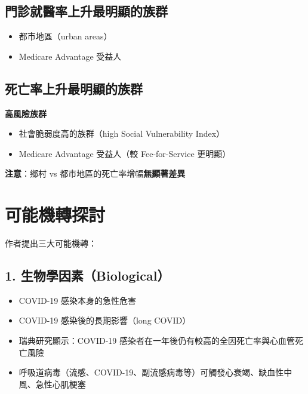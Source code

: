 \documentclass[12pt,a4paper]{article}
\begin{document}
\subsection{門診就醫率上升最明顯的族群}
\begin{itemize}
    \item 都市地區（urban areas）
    \item Medicare Advantage 受益人
\end{itemize}

\subsection{死亡率上升最明顯的族群}

\begin{importantbox}
\textbf{高風險族群}
\begin{itemize}
    \item 社會脆弱度高的族群（high Social Vulnerability Index）
    \item Medicare Advantage 受益人（較 Fee-for-Service 更明顯）
\end{itemize}

\textbf{注意}：鄉村 vs 都市地區的死亡率增幅\textbf{無顯著差異}
\end{importantbox}

\section{可能機轉探討}

作者提出三大可能機轉：

\subsection{1. 生物學因素（Biological）}
\begin{itemize}
    \item COVID-19 感染本身的急性危害
    \item COVID-19 感染後的長期影響（long COVID）
    \item 瑞典研究顯示：COVID-19 感染者在一年後仍有較高的全因死亡率與心血管死亡風險
    \item 呼吸道病毒（流感、COVID-19、副流感病毒等）可觸發心衰竭、缺血性中風、急性心肌梗塞
\end{itemize}
\end{document}
